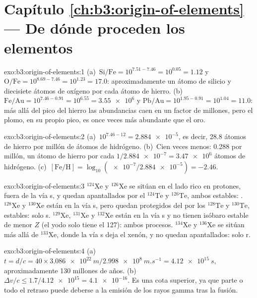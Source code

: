 \section*{Capítulo \ref{ch:b3:origin-of-elements} --- De dónde proceden los elementos}

\begin{solution}{exo:b3:origin-of-elements:1}
(a)~$\mathrm{Si/Fe} = 10^{7.51 - 7.46} = 10^{0.05} = 1.12$ y
$\mathrm{O/Fe} = 10^{8.69 - 7.46} = 10^{1.23} = 17.0$: aproximadamente un átomo de
silicio y diecisiete átomos de oxígeno por cada átomo de hierro. (b)~$\mathrm{Fe/Au} =
10^{7.46 - 0.91} = 10^{6.55} = \num{3.55e6}$ y $\mathrm{Pb/Au} =
10^{1.95 - 0.91} = 10^{1.04} = 11.0$: más allá del pico del hierro las abundancias
caen en un factor de millones, pero el plomo, en su propio pico, es once veces más
abundante que el oro.
\end{solution}

\begin{solution}{exo:b3:origin-of-elements:2}
(a)~$10^{7.46 - 12} = \num{2.884e-5}$, es decir, \num{28.8} átomos de hierro por
millón de átomos de hidrógeno. (b)~Cien veces menos: \num{0.288} por
millón, un átomo de hierro por cada $1/\num{2.884e-7} = \num{3.47e6}$ átomos de
hidrógeno. (c)~$[\mathrm{Fe/H}] = \log_{10}(\num{e-7}/\num{2.884e-5}) =
-2.46$.
\end{solution}

\begin{solution}{exo:b3:origin-of-elements:3}
$^{124}\mathrm{Xe}$ y $^{126}\mathrm{Xe}$ se sitúan en el lado rico en protones,
fuera de la vía s, y quedan apantallados por el $^{124}\mathrm{Te}$ y
$^{126}\mathrm{Te}$, ambos estables: . $^{128}\mathrm{Xe}$ y $^{130}\mathrm{Xe}$
están en la vía s, pero quedan protegidos del  por los
$^{128}\mathrm{Te}$ y $^{130}\mathrm{Te}$, estables: solo s. $^{129}\mathrm{Xe}$,
$^{131}\mathrm{Xe}$ y $^{132}\mathrm{Xe}$ están en la vía s y no tienen
isóbaro estable de menor $Z$ (el yodo solo tiene el 127): ambos procesos.
$^{134}\mathrm{Xe}$ y $^{136}\mathrm{Xe}$ se sitúan más allá de
$^{133}\mathrm{Xe}$, donde la vía s deja el xenón, y no quedan
apantallados: solo r.
\end{solution}

\begin{solution}{exo:b3:origin-of-elements:4}
(a)~$t = d/c = 40\times\qty{3.086e22}{m}/\qty{2.998e8}{m.s^{-1}} =
\qty{4.12e15}{s}$, aproximadamente \num{130} millones de años. (b)~$\Delta v/c \le
1.7/\num{4.12e15} = \num{4.1e-16}$. Es una cota superior, ya que parte o
todo el retraso puede deberse a la emisión de los rayos gamma tras la
fusión.
\end{solution}

